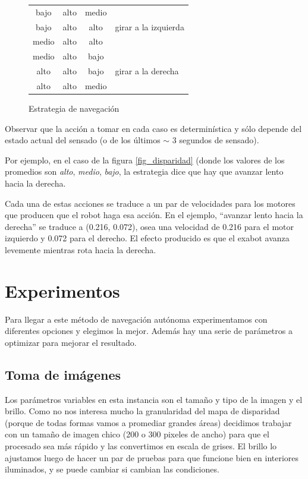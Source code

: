 \documentclass[journal,a4paper]{IEEEtran}
\newcommand{\alto}{{\cellcolor{red!65} alto}}
\newcommand{\medio}{{\cellcolor{red!50!blue!65} medio}}
\newcommand{\bajo}{{\cellcolor{blue!65} bajo}}
\newcommand{\multi}[2]{\multirow{#1}{*}{\parbox{3.7cm}{#2}}}
\begin{document}
\begin{figure}[h!]
\begin{tabular}{|c|c|c|p{3.7cm}|}
    \hline
    \bajo & \alto & \medio & \multi{3}{girar a la izquierda}\\
    \cline{1-3}
    \bajo & \alto & \alto & \\
    \cline{1-3}
    \medio & \alto & \alto & \\

    \hline
    \medio & \alto & \bajo & \multi{3}{girar a la derecha}\\
    \cline{1-3}
    \alto & \alto & \bajo & \\
    \cline{1-3}
    \alto & \alto & \medio & \\
    \hline
    \end{tabular}
    
    \caption{Estrategia de navegación}
    \label{tbl_estrategia}
\end{figure}

Observar que la acción a tomar en cada caso es determinística y sólo depende del estado actual del sensado (o de los últimos $\sim$ 3 segundos de sensado).

Por ejemplo, en el caso de la figura \ref{fig_disparidad} (donde los valores de los promedios son \emph{alto}, \emph{medio}, \emph{bajo}, la estrategia dice que hay que avanzar lento hacia la derecha.

Cada una de estas acciones se traduce a un par de velocidades para los motores que producen que el robot haga esa acción. En el ejemplo, ``avanzar lento hacia la derecha'' se traduce a (0.216, 0.072), osea una velocidad de 0.216 para el motor izquierdo y 0.072 para el derecho. El efecto producido es que el exabot avanza levemente mientras rota hacia la derecha.


\newpage
\section{Experimentos}
Para llegar a este método de navegación autónoma experimentamos con diferentes opciones y elegimos la mejor.
Además hay una serie de parámetros a optimizar para mejorar el resultado.

\subsection{Toma de imágenes}
Los parámetros variables en esta instancia son el tamaño y tipo de la imagen y el brillo.
Como no nos interesa mucho la granularidad del mapa de disparidad (porque de todas formas vamos a promediar grandes áreas) decidimos trabajar con un tamaño de imagen chico (200 o 300 pixeles de ancho) para que el procesado sea más rápido y las convertimos en escala de grises.
El brillo lo ajustamos luego de hacer un par de pruebas para que funcione bien en interiores iluminados, y se puede cambiar si cambian las condiciones.
\end{document}
